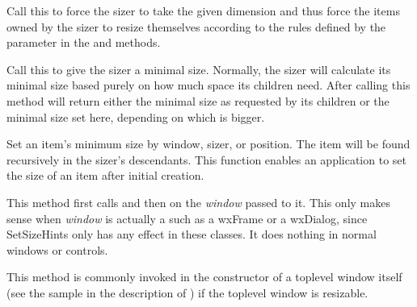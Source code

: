 
Call this to force the sizer to take the given dimension and thus force the items owned
by the sizer to resize themselves according to the rules defined by the parameter in the 
 and  methods.


\label{wxsizersetminsize}



Call this to give the sizer a minimal size. Normally, the sizer will calculate its
minimal size based purely on how much space its children need. After calling this
method  will return either the minimal size
as requested by its children or the minimal size set here, depending on which is
bigger.


\label{wxsizersetitemminsize}




Set an item's minimum size by window, sizer, or position. The item will be found recursively
in the sizer's descendants. This function enables an application to set the size of an item
after initial creation.


\label{wxsizersetsizehints}


This method first calls  and then 
 on the {\it window}
passed to it. This only makes sense when {\it window} is actually a
 such as a wxFrame or a
wxDialog, since SetSizeHints only has any effect in these classes. 
It does nothing in normal windows or controls.

This method is commonly invoked in the constructor of a toplevel window itself
(see the sample in the description of ) if the
toplevel window is resizable.

